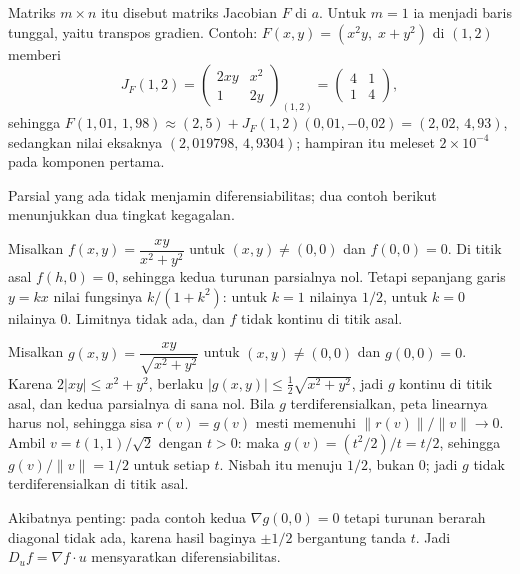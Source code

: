 
Matriks $m\times n$ itu disebut matriks Jacobian $F$ di $a$. Untuk $m=1$ ia
menjadi baris tunggal, yaitu transpos gradien. Contoh: $F(x,y)=(x^{2}y,\;x+y^{2})$ di $(1,2)$
memberi
\[
  J_{F}(1,2)=\begin{pmatrix}2xy & x^{2}\\ 1 & 2y\end{pmatrix}_{(1,2)}
  =\begin{pmatrix}4&1\\ 1&4\end{pmatrix},
\]
sehingga $F(1{,}01,\,1{,}98)\approx(2,5)+J_{F}(1,2)(0{,}01,-0{,}02)=(2{,}02,\,4{,}93)$,
sedangkan nilai eksaknya $(2{,}019798,\,4{,}9304)$; hampiran itu meleset $2\times10^{-4}$
pada komponen pertama.

Parsial yang ada tidak menjamin diferensiabilitas; dua contoh berikut menunjukkan dua tingkat
kegagalan.

\begin{contoh}
Misalkan $f(x,y)=\dfrac{xy}{x^{2}+y^{2}}$ untuk $(x,y)\neq(0,0)$ dan $f(0,0)=0$. Di titik
asal $f(h,0)=0$, sehingga kedua turunan parsialnya nol. Tetapi sepanjang garis $y=kx$ nilai
fungsinya $k/(1+k^{2})$: untuk $k=1$ nilainya $1/2$, untuk $k=0$ nilainya $0$. Limitnya tidak
ada, dan $f$ tidak kontinu di titik asal.
\end{contoh}

\begin{contoh}
Misalkan $g(x,y)=\dfrac{xy}{\sqrt{x^{2}+y^{2}}}$ untuk $(x,y)\neq(0,0)$ dan $g(0,0)=0$.
Karena $2|xy|\le x^{2}+y^{2}$, berlaku $|g(x,y)|\le\frac12\sqrt{x^{2}+y^{2}}$, jadi $g$
kontinu di titik asal, dan kedua parsialnya di sana nol. Bila $g$ terdiferensialkan, peta
linearnya harus nol, sehingga sisa $r(v)=g(v)$ mesti memenuhi $\|r(v)\|/\|v\|\to0$. Ambil
$v=t(1,1)/\sqrt{2}$ dengan $t>0$: maka $g(v)=(t^{2}/2)/t=t/2$, sehingga
$g(v)/\|v\|=1/2$ untuk setiap $t$. Nisbah itu menuju $1/2$, bukan $0$; jadi $g$ tidak
terdiferensialkan di titik asal.
\end{contoh}

Akibatnya penting: pada contoh kedua $\nabla g(0,0)=0$ tetapi turunan berarah diagonal tidak
ada, karena hasil baginya $\pm1/2$ bergantung tanda $t$. Jadi $D_{u}f=\nabla f\cdot u$
mensyaratkan diferensiabilitas.

